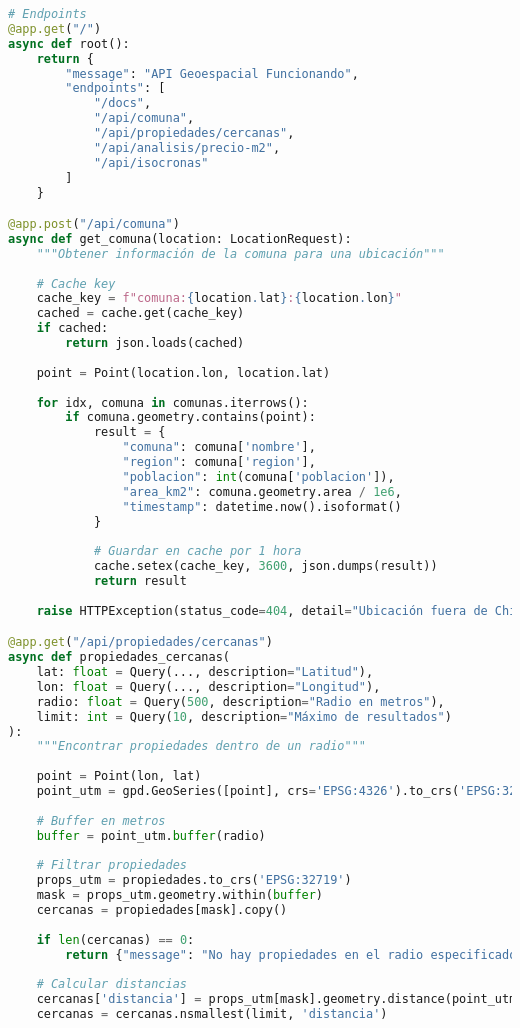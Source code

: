 \documentclass[11pt,a4paper]{article}
\begin{document}
\begin{lstlisting}[language=Python]
# Endpoints
@app.get("/")
async def root():
    return {
        "message": "API Geoespacial Funcionando",
        "endpoints": [
            "/docs",
            "/api/comuna",
            "/api/propiedades/cercanas",
            "/api/analisis/precio-m2",
            "/api/isocronas"
        ]
    }

@app.post("/api/comuna")
async def get_comuna(location: LocationRequest):
    """Obtener información de la comuna para una ubicación"""
    
    # Cache key
    cache_key = f"comuna:{location.lat}:{location.lon}"
    cached = cache.get(cache_key)
    if cached:
        return json.loads(cached)
    
    point = Point(location.lon, location.lat)
    
    for idx, comuna in comunas.iterrows():
        if comuna.geometry.contains(point):
            result = {
                "comuna": comuna['nombre'],
                "region": comuna['region'],
                "poblacion": int(comuna['poblacion']),
                "area_km2": comuna.geometry.area / 1e6,
                "timestamp": datetime.now().isoformat()
            }
            
            # Guardar en cache por 1 hora
            cache.setex(cache_key, 3600, json.dumps(result))
            return result
    
    raise HTTPException(status_code=404, detail="Ubicación fuera de Chile")

@app.get("/api/propiedades/cercanas")
async def propiedades_cercanas(
    lat: float = Query(..., description="Latitud"),
    lon: float = Query(..., description="Longitud"),
    radio: float = Query(500, description="Radio en metros"),
    limit: int = Query(10, description="Máximo de resultados")
):
    """Encontrar propiedades dentro de un radio"""
    
    point = Point(lon, lat)
    point_utm = gpd.GeoSeries([point], crs='EPSG:4326').to_crs('EPSG:32719')[0]
    
    # Buffer en metros
    buffer = point_utm.buffer(radio)
    
    # Filtrar propiedades
    props_utm = propiedades.to_crs('EPSG:32719')
    mask = props_utm.geometry.within(buffer)
    cercanas = propiedades[mask].copy()
    
    if len(cercanas) == 0:
        return {"message": "No hay propiedades en el radio especificado", "results": []}
    
    # Calcular distancias
    cercanas['distancia'] = props_utm[mask].geometry.distance(point_utm)
    cercanas = cercanas.nsmallest(limit, 'distancia')
    

\end{lstlisting}
\end{document}
